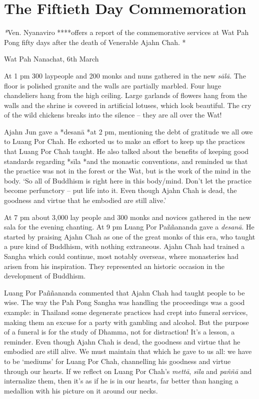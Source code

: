 \chapter{The Fiftieth Day Commemoration}

\emph{*}Ven. Nyanaviro ****offers a report of the
commemorative services at Wat Pah Pong fifty days after the death
of Venerable Ajahn Chah. *

Wat Pah Nanachat, 6th March

At 1 pm 300 laypeople and 200 monks and nuns gathered in the new
\emph{sālā}. The floor is polished granite and the walls are partially
marbled. Four huge chandeliers hang from the high ceiling. Large
garlands of flowers hang from the walls and the shrine is covered in
artificial lotuses, which look beautiful. The cry of the wild chickens
breaks into the silence -- they are all over the Wat!

Ajahn Jun gave a *desanā *at 2 pm, mentioning the debt of gratitude we
all owe to Luang Por Chah. He exhorted us to make an effort to keep up
the practices that Luang Por Chah taught. He also talked about the
benefits of keeping good standards regarding *sīla *and the monastic
conventions, and reminded us that the practice was not in the forest or
the Wat, but is the work of the mind in the body. `So all of Buddhism is
right here in this body/mind. Don't let the practice become perfunctory
-- put life into it. Even though Ajahn Chah is dead, the goodness and
virtue that he embodied are still alive.'

At 7 pm about 3,000 lay people and 300 monks and novices gathered in the
new sala for the evening chanting. At 9 pm Luang Por Paññananda gave a
\emph{desanā}. He started by praising Ajahn Chah as one of the great
monks of this era, who taught a pure kind of Buddhism, with nothing
extraneous. Ajahn Chah had trained a Sangha which could continue, most
notably overseas, where monasteries had arisen from his inspiration.
They represented an historic occasion in the development of Buddhism.

Luang Por Paññananda commented that Ajahn Chah had taught people to be
wise. The way the Pah Pong Sangha was handling the proceedings was a
good example: in Thailand some degenerate practices had crept into
funeral services, making them an excuse for a party with gambling and
alcohol. But the purpose of a funeral is for the study of Dhamma, not
for distraction! It's a lesson, a reminder. Even though Ajahn Chah is
dead, the goodness and virtue that he embodied are still alive. We must
maintain that which he gave to us all: we have to be `mediums' for Luang
Por Chah, channelling his goodness and virtue through our hearts. If we
reflect on Luang Por Chah's \emph{mettā}, \emph{sīla} and \emph{paññā}
and internalize them, then it's as if he is in our hearts, far better
than hanging a medallion with his picture on it around our necks.

